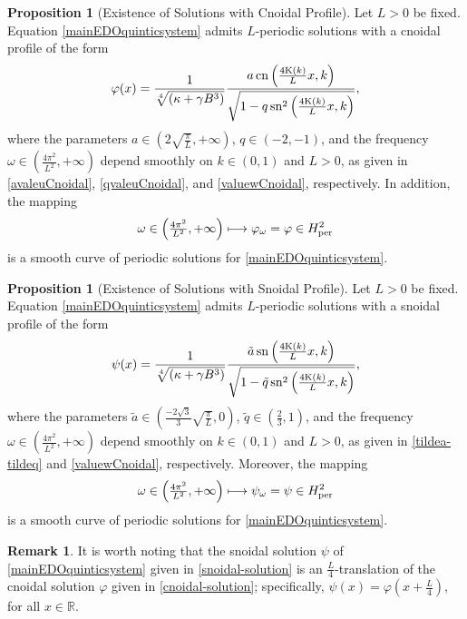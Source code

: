 \documentclass[10pt,reqno,a4paper]{amsart} %
\theoremstyle{definition} %
\numberwithin{equation}{section}
\numberwithin{figure}{section}
\newtheorem{proposition}[theorem]{Proposition}
\newtheorem{remark}[theorem]{Remark}
\begin{document}
\begin{proposition}[Existence of Solutions with Cnoidal Profile]\label{cnoidalcurve}
	Let $L>0$ be fixed. Equation \eqref{mainEDOquinticsystem} admits $L$-periodic solutions with a cnoidal profile of the form
	\begin{equation}\label{cnoidal-solution}
		\varphi(x) = \frac{1}{\sqrt[4]{(\kappa + \gamma B^3)}}\frac{ a \, {\rm cn}\left( \frac{4{\rm K}(k)}{L}x,k\right)}{\sqrt{ 1 - q \, {\rm sn}^2 \left( \frac{4 {\rm K}(k)}{L} x, k \right)}},
	\end{equation}
	where the parameters $a \in \left( 2\sqrt{\tfrac{\pi}{L}}, +\infty \right)$, $q \in (-2,-1)$, and the frequency $\omega \in \left( \frac{4\pi^2}{L^2},+\infty\right)$ depend smoothly on $k\in (0,1)$ and $L>0$, as given in \eqref{avaleuCnoidal}, \eqref{qvaleuCnoidal}, and \eqref{valuewCnoidal}, respectively. In addition, the mapping
	$$\omega \in \left( \tfrac{4\pi^2}{L^2},+\infty \right) \longmapsto \varphi_\omega=\varphi \in H^2_{\rm per}$$
	is a smooth curve of periodic solutions for \eqref{mainEDOquinticsystem}.
\end{proposition}

\begin{proposition}[Existence of Solutions with Snoidal Profile]\label{snoidalcurve}
	Let $L>0$ be fixed. Equation \eqref{mainEDOquinticsystem} admits $L$-periodic solutions with a snoidal profile of the form
	\begin{equation}\label{snoidal-solution}
		\psi(x) = \frac{1}{\sqrt[4]{(\kappa + \gamma B^3)}}\frac{ \tilde{a} \, {\rm sn}\left( \frac{4{\rm K}(k)}{L}x,k\right)}{\sqrt{ 1 - \tilde{q} \, {\rm sn}^2 \left( \frac{4 {\rm K}(k)}{L} x, k \right)}},
	\end{equation}
	where the parameters $\tilde{a} \in \left( \frac{-2\sqrt{3}}{3} \sqrt{\frac{\pi}{L}} , 0 \right)$, $\tilde{q} \in \left( \frac{2}{3}, 1 \right)$, and the frequency $\omega \in \left( \frac{4\pi^2}{L^2},+\infty\right)$ depend smoothly on $k\in (0,1)$ and $L>0$, as given in \eqref{tildea-tildeq} and \eqref{valuewCnoidal}, respectively. Moreover, the mapping
	$$\omega \in \left( \tfrac{4\pi^2}{L^2},+\infty \right) \longmapsto \psi_\omega=\psi \in H^2_{\rm per}$$
	is a smooth curve of periodic solutions for \eqref{mainEDOquinticsystem}.
\end{proposition}

 
\begin{remark}
	It is worth noting that the snoidal solution $\psi$ of \eqref{mainEDOquinticsystem} given in \eqref{snoidal-solution} is an $\frac{L}{4}$-translation of the cnoidal solution $\varphi$ given in \eqref{cnoidal-solution}; specifically, $\psi(x) =  \varphi \left(x + \frac{L}{4} \right)$, for all $x \in \mathbb{R}$.
\end{remark}
\end{document}
